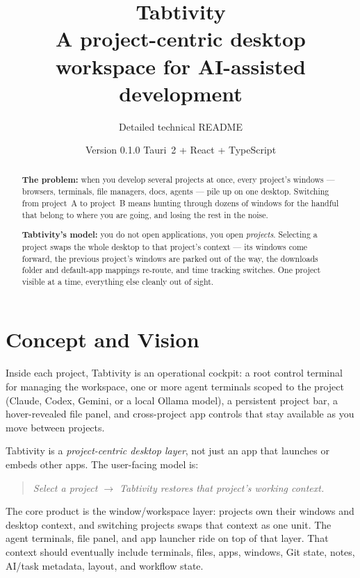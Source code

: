 \documentclass[11pt,a4paper]{article}
\title{\vspace{-1.2cm}\textbf{\color{tabtivityblue}Tabtivity}\\[0.3em]
\large A project-centric desktop workspace for AI-assisted development}
\author{Detailed technical README}
\date{Version 0.1.0 \quad\textbullet\quad Tauri~2 + React + TypeScript}
\begin{document}
\maketitle
\thispagestyle{fancy}

\begin{abstract}
\noindent
\textbf{The problem:} when you develop several projects at once, every project's
windows --- browsers, terminals, file managers, docs, agents --- pile up on one
desktop. Switching from project~A to project~B means hunting through dozens of
windows for the handful that belong to where you are going, and losing the rest
in the noise.

\smallskip
\noindent
\textbf{Tabtivity's model:} you do not open applications, you open \emph{projects}.
Selecting a project swaps the whole desktop to that project's context --- its
windows come forward, the previous project's windows are parked out of the way,
the downloads folder and default-app mappings re-route, and time tracking
switches. One project visible at a time, everything else cleanly out of sight.
\end{abstract}

\tableofcontents
\vspace{0.6cm}

\section{Concept and Vision}

Inside each project, Tabtivity is an operational cockpit: a root control terminal
for managing the workspace, one or more agent terminals scoped to the project
(Claude, Codex, Gemini, or a local Ollama model), a persistent project bar, a
hover-revealed file panel, and cross-project app controls that stay available as
you move between projects.

Tabtivity is a \emph{project-centric desktop layer}, not just an app that launches
or embeds other apps. The user-facing model is:

\begin{quote}
\itshape Select a project $\rightarrow$ Tabtivity restores that project's working
context.
\end{quote}

The core product is the window/workspace layer: projects own their windows and
desktop context, and switching projects swaps that context as one unit. The
agent terminals, file panel, and app launcher ride on top of that layer. That
context should eventually include terminals, files, apps, windows, Git state,
notes, AI/task metadata, layout, and workflow state.
\end{document}
